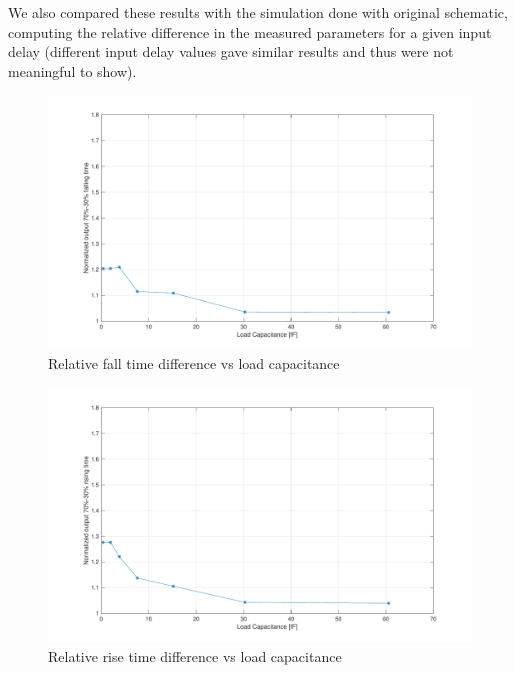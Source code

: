 \documentclass[a4paper]{article}
\begin{document}
We also compared these results with the simulation done with original schematic, computing the relative difference in the measured parameters for a given input delay (different input delay values gave similar results and thus were not meaningful to show).
\begin{figure}[H]
	\centering
	\includegraphics[width=\linewidth]{../INV_X4/simulations/t_F_diff.pdf}
	\caption{Relative fall time difference vs load capacitance}
	\label{fig:inv_t_F_diff}
\end{figure}
\begin{figure}[H]
	\centering
	\includegraphics[width=\linewidth]{../INV_X4/simulations/t_R_diff.pdf}
	\caption{Relative rise time difference vs load capacitance}
	\label{fig:inv_t_R_diff}
\end{figure}
\end{document}

